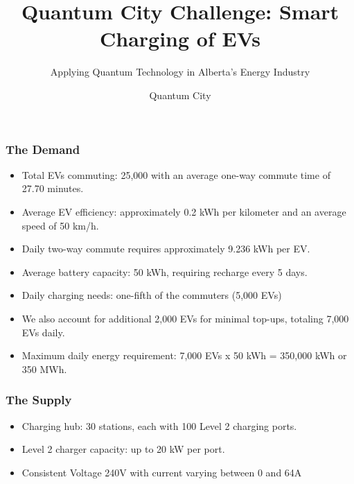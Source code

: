 \documentclass{beamer}
\title{Quantum City Challenge: Smart Charging of EVs}
\subtitle{Applying Quantum Technology in Alberta's Energy Industry}
\author{Quantum City}
\begin{document}
\begin{frame}
  \titlepage
\end{frame}


\begin{frame}
    \frametitle{The Demand}
    \begin{itemize}
        \pause
        \item Total EVs commuting: 25,000 with an average one-way commute time of 27.70 minutes.
        \pause
        \item Average EV efficiency: approximately 0.2 kWh per kilometer and an average speed of 50 km/h.
        \pause
        \item Daily two-way commute requires approximately 9.236 kWh per EV.
        \pause
        \item Average battery capacity: 50 kWh, requiring recharge every 5 days.
        \pause
        \item Daily charging needs: one-fifth of the commuters (5,000 EVs) 
        \pause
        \item We also account for  additional 2,000 EVs for minimal top-ups, totaling 7,000 EVs daily.
        \pause
        \item Maximum daily energy requirement: 7,000 EVs x 50 kWh = 350,000 kWh or 350 MWh.
    \end{itemize}
    \end{frame}
    
    \begin{frame}
    \frametitle{The Supply}
    \begin{itemize}
        \pause
        \item Charging hub: 30 stations, each with 100 Level 2 charging ports.
        \pause
        \item Level 2 charger capacity: up to 20 kW per port.
        \pause
        \item Consistent Voltage 240V with current varying between 0 and 64A
    \end{itemize}
    \end{frame}
    
\end{document}
